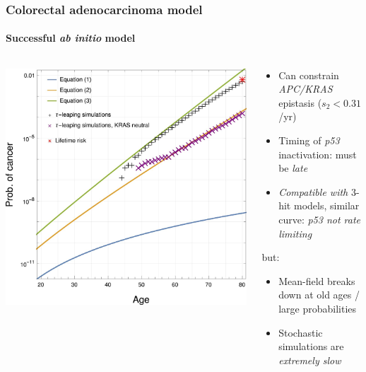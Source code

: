 \documentclass{beamer}
\begin{document}
\begin{frame}
    \frametitle{Colorectal adenocarcinoma model}
    \framesubtitle{Successful \emph{ab initio} model}
    \begin{columns}
        \begin{column}{0.5\textwidth}
        \includegraphics[width=\textwidth]{figures/F2.large.jpg}
        \end{column}
        \begin{column}{0.5\textwidth}
        \begin{itemize}
            \item Can constrain \emph{APC/KRAS} epistasis ($s_{2} < 0.31$/yr)
            \item Timing of \emph{p53} inactivation: must be \emph{late}
            \item \emph{Compatible with} 3-hit models, similar curve: 
                  \emph{p53 not rate limiting}
        \end{itemize}
        but:
        \begin{itemize}
            \item Mean-field breaks down at old ages / large probabilities
            \item Stochastic simulations are \emph{extremely slow}
        \end{itemize}
        \end{column}
    \end{columns}
\end{frame}
\end{document}

